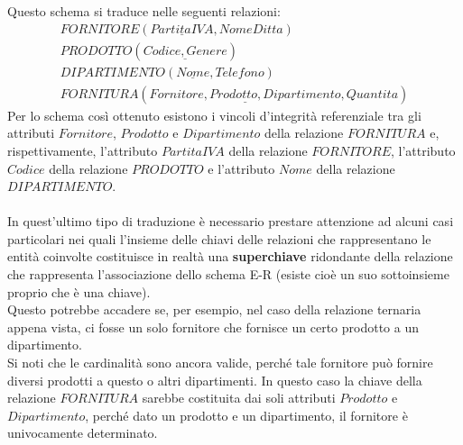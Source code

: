 Questo schema si traduce nelle seguenti relazioni:
    \begin{equation}\begin{aligned}
        FORNITORE(\underline{PartitaIVA}, NomeDitta)\\
        PRODOTTO(\underline{Codice, Genere})\\
        DIPARTIMENTO(\underline{Nome}, Telefono)\\
        FORNITURA(\underline{Fornitore, Prodotto, Dipartimento}, Quantita)
    \end{aligned}\end{equation}
Per lo schema così ottenuto esistono i vincoli d'integrità referenziale tra gli attributi $Fornitore$, $Prodotto$ e $Dipartimento$ della relazione $FORNITURA$ e, rispettivamente, l'attributo $PartitaIVA$ della relazione $FORNITORE$, l'attributo $Codice$ della relazione $PRODOTTO$ e l'attributo $Nome$ della relazione $DIPARTIMENTO$.\\\\
In quest'ultimo tipo di traduzione è necessario prestare attenzione ad alcuni casi particolari nei quali l'insieme delle chiavi delle relazioni che rappresentano le entità coinvolte costituisce in realtà una \textbf{superchiave} ridondante della relazione che rappresenta l'associazione dello schema E-R (esiste cioè un suo sottoinsieme proprio che è una chiave).\\
Questo potrebbe accadere se, per esempio, nel caso della relazione ternaria appena vista, ci fosse un solo fornitore che fornisce un certo prodotto a un dipartimento.\\
Si noti che le cardinalità sono ancora valide, perché tale fornitore può fornire diversi prodotti a questo o altri dipartimenti. In questo caso la chiave della relazione $FORNITURA$ sarebbe costituita dai soli attributi $Prodotto$ e $Dipartimento$, perché dato un prodotto e un dipartimento, il fornitore è univocamente determinato. 

